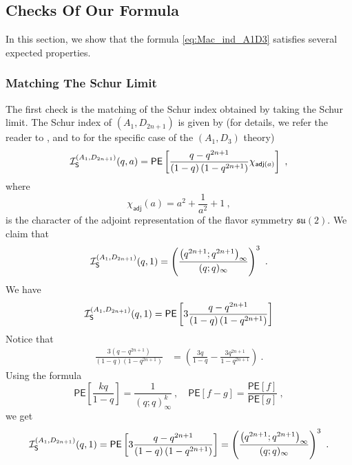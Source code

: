 \documentclass[a4paper,10pt]{article}
\newcommand{\mr}[1]{\mathsf{#1}}
\newcommand{\mf}[1]{\mathfrak{#1}}
\def\PE{\mathsf{PE}}
\def\CI {{\cal I}}
\def\CI {{{\cal I}}}
\begin{document}
\subsection{Checks Of Our Formula}
In this section, we show that the formula \eqref{eq:Mac_ind_A1D3} satisfies several expected properties. 
\subsubsection{Matching The Schur Limit}
The first check is the matching of the Schur index obtained by taking the Schur limit. The Schur index of $(A_1,D_{2n+1})$ is given by (for details, we refer the reader to \cite{Cordova:2015nma, Song:2016yfd}, and to \cite{Buican:2015ina, Buican:2015hsa} for the specific case of the $(A_1,D_3)$ theory)
\begin{equation}
    \CI_{\mathsf{S}}^{(A_1,D_{2n+1})}(q,a)=\mr{PE}\left[\frac{q-q^{2 n+1}}{(1-q)\left(1-q^{2 n+1}\right)} \chi_{\mr{adj}(a)}\right]~,
\end{equation}
where 
\begin{equation}
    \chi_{\mathsf{adj}}(a)=a^2+\frac{1}{a^2}+1~, 
\end{equation}
is the character of the adjoint representation of the flavor symmetry $\mf{su}(2)$. We claim that 
\begin{equation}\label{eq:schur_D2n+1_pochh_form}
\CI_{\mathsf{S}}^{(A_1,D_{2n+1})}(q,1)=\left(\frac{\left(q^{2n+1} ; q^{2n+1}\right)_{\infty}}{(q ; q)_{\infty}}\right)^3~.    
\end{equation}
We have 
\begin{equation}
 \CI_{\mathsf{S}}^{(A_1,D_{2n+1})}(q,1)=\mr{PE}\left[3\frac{q-q^{2 n+1}}{(1-q)\left(1-q^{2 n+1}\right)} \right]   
\end{equation}
Notice that
\begin{equation}
\begin{split}
\frac{3(q-q^{2 n+1})}{(1-q)(1-q^{2 n+1})}&=\left(\frac{3 q}{1-q}-\frac{3 q^{2 n+1}}{1-q^{2 n+1}}\right) ~.
\end{split}
\end{equation}
Using the formula 
\begin{equation}
    \mr{PE}\left[\frac{kq}{1-q}\right]=\frac{1}{(q;q)^k_\infty} ~,\quad \PE[f-g]=\frac{\PE[f]}{\PE[g]}~,
\end{equation}
we get
\begin{equation}
    \CI_{\mathsf{S}}^{(A_1,D_{2n+1})}(q,1)=\mr{PE}\left[3\frac{q-q^{2 n+1}}{(1-q)\left(1-q^{2 n+1}\right)} \right]  =\left(\frac{\left(q^{2n+1} ; q^{2n+1}\right)_{\infty}}{(q ; q)_{\infty}}\right)^3~.
\end{equation}
\end{document}
